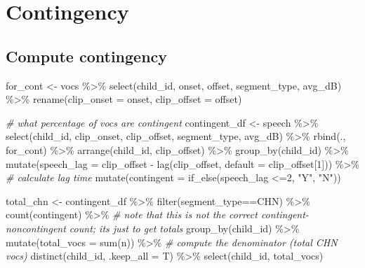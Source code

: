\documentclass[
]{article}
\newenvironment{Shaded}{\begin{snugshade}}{\end{snugshade}}
\newcommand{\AttributeTok}[1]{\textcolor[rgb]{0.77,0.63,0.00}{#1}}
\newcommand{\CommentTok}[1]{\textcolor[rgb]{0.56,0.35,0.01}{\textit{#1}}}
\newcommand{\DecValTok}[1]{\textcolor[rgb]{0.00,0.00,0.81}{#1}}
\newcommand{\FunctionTok}[1]{\textcolor[rgb]{0.00,0.00,0.00}{#1}}
\newcommand{\NormalTok}[1]{#1}
\newcommand{\OtherTok}[1]{\textcolor[rgb]{0.56,0.35,0.01}{#1}}
\newcommand{\SpecialCharTok}[1]{\textcolor[rgb]{0.00,0.00,0.00}{#1}}
\newcommand{\StringTok}[1]{\textcolor[rgb]{0.31,0.60,0.02}{#1}}
\begin{document}
\hypertarget{contingency}{%
\section{Contingency}\label{contingency}}

\hypertarget{compute-contingency}{%
\subsection{Compute contingency}\label{compute-contingency}}

\begin{Shaded}
\begin{Highlighting}[]
\NormalTok{for\_cont }\OtherTok{\textless{}{-}}\NormalTok{ vocs }\SpecialCharTok{\%\textgreater{}\%} 
  \FunctionTok{select}\NormalTok{(child\_id, onset, offset, segment\_type, avg\_dB) }\SpecialCharTok{\%\textgreater{}\%}
  \FunctionTok{rename}\NormalTok{(}\AttributeTok{clip\_onset =}\NormalTok{ onset,}
         \AttributeTok{clip\_offset =}\NormalTok{ offset)}

\CommentTok{\# what percentage of vocs are contingent}
\NormalTok{contingent\_df }\OtherTok{\textless{}{-}}\NormalTok{ speech }\SpecialCharTok{\%\textgreater{}\%}
  \FunctionTok{select}\NormalTok{(child\_id, clip\_onset, clip\_offset, segment\_type, avg\_dB) }\SpecialCharTok{\%\textgreater{}\%}
  \FunctionTok{rbind}\NormalTok{(., for\_cont) }\SpecialCharTok{\%\textgreater{}\%}
  \FunctionTok{arrange}\NormalTok{(child\_id, clip\_offset) }\SpecialCharTok{\%\textgreater{}\%}
  \FunctionTok{group\_by}\NormalTok{(child\_id) }\SpecialCharTok{\%\textgreater{}\%}
  \FunctionTok{mutate}\NormalTok{(}\AttributeTok{speech\_lag =}\NormalTok{ clip\_offset }\SpecialCharTok{{-}} \FunctionTok{lag}\NormalTok{(clip\_offset, }\AttributeTok{default =}\NormalTok{ clip\_offset[}\DecValTok{1}\NormalTok{])) }\SpecialCharTok{\%\textgreater{}\%} \CommentTok{\# calculate lag time}
  \FunctionTok{mutate}\NormalTok{(}\AttributeTok{contingent =} \FunctionTok{if\_else}\NormalTok{(speech\_lag }\SpecialCharTok{\textless{}=}\DecValTok{2}\NormalTok{, }\StringTok{"Y"}\NormalTok{, }\StringTok{"N"}\NormalTok{)) }

\NormalTok{total\_chn }\OtherTok{\textless{}{-}}\NormalTok{ contingent\_df }\SpecialCharTok{\%\textgreater{}\%}
  \FunctionTok{filter}\NormalTok{(segment\_type}\SpecialCharTok{==}\StringTok{\textquotesingle{}CHN\textquotesingle{}}\NormalTok{) }\SpecialCharTok{\%\textgreater{}\%}
  \FunctionTok{count}\NormalTok{(contingent) }\SpecialCharTok{\%\textgreater{}\%} \CommentTok{\# note that this is not the correct contingent{-}noncontingent count; it\textquotesingle{}s just to get totals}
  \FunctionTok{group\_by}\NormalTok{(child\_id) }\SpecialCharTok{\%\textgreater{}\%}
  \FunctionTok{mutate}\NormalTok{(}\AttributeTok{total\_vocs =} \FunctionTok{sum}\NormalTok{(n)) }\SpecialCharTok{\%\textgreater{}\%}  \CommentTok{\# compute the denominator (total CHN vocs)}
  \FunctionTok{distinct}\NormalTok{(child\_id, }\AttributeTok{.keep\_all =}\NormalTok{ T) }\SpecialCharTok{\%\textgreater{}\%}
  \FunctionTok{select}\NormalTok{(child\_id, total\_vocs)}


\end{Highlighting}
\end{Shaded}
\end{document}
